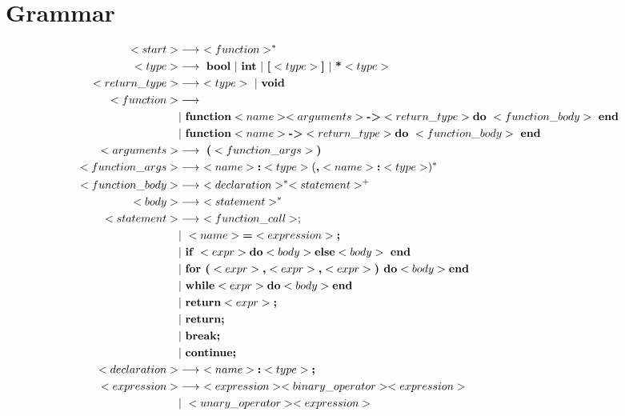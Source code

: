 \documentclass{article}
\begin{document}
\section{Grammar}
\begin{align*}
<start> &\longrightarrow \ <function>^* \\
<type> &\longrightarrow \ \textbf{bool} \ | \ \textbf{int} \ | \ \textbf{[}<type>\textbf{]} \ | \ \textbf{*} <type> \\
<return\_type> &\longrightarrow \ <type> \ | \ \textbf{void} \\
<function>  &\longrightarrow \\ 
    &| \ \textbf{function} <name> <arguments> \textbf{-\textgreater} <return\_type> \textbf{do} \ <function\_body> \ \textbf{end} \\
    &| \ \textbf{function} <name> \textbf{-\textgreater} <return\_type> \textbf{do} \ <function\_body> \ \textbf{end} \\
<arguments> &\longrightarrow \ \textbf{(} <function\_args>\textbf{)} \\
<function\_args> &\longrightarrow \ <name> \textbf{:} <type> (\textbf{,} <name> \textbf{:} <type>)^* \\
<function\_body> &\longrightarrow \ <declaration>^* <statement>^+ \\
<body> &\longrightarrow \ <statement>^* \\
<statement> &\longrightarrow \ <function\_call>; \\
    &| \ <name> \textbf{=} <expression> \textbf{;}\\ 
    &| \ \textbf{if } <expr> \textbf{do} <body> \textbf{else} <body>  \ \textbf{end} \\
    &| \ \textbf{for (} <expr> \textbf{,} <expr> \textbf{,} <expr> \textbf{) do} <body> \textbf{end} \\ 
    &| \ \textbf{while} <expr> \textbf{do} <body> \textbf{end} \\
    &| \ \textbf{return} <expr> \textbf{;} \\
    &| \ \textbf{return;} \\
    &| \ \textbf{break;} \\ 
    &| \ \textbf{continue;} \\ 
<declaration>  &\longrightarrow \ <name> \textbf{:} <type> \textbf{;} \\
<expression> &\longrightarrow \ <expression> <binary\_operator> <expression> \\
    &| \ <unary\_operator> <expression> \\

\end{align*}
\end{document}
